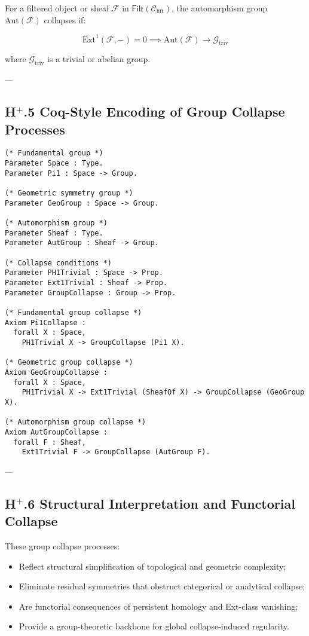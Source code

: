 \documentclass[11pt]{article}
\begin{document}
For a filtered object or sheaf $\mathcal{F}$ in $\mathsf{Filt}(\mathcal{C}_{\mathrm{lift}})$, the automorphism group $\mathrm{Aut}(\mathcal{F})$ collapses if:

\[
\mathrm{Ext}^1(\mathcal{F}, -) = 0 \implies \mathrm{Aut}(\mathcal{F}) \longrightarrow \mathcal{G}_{\mathrm{triv}}
\]

where $\mathcal{G}_{\mathrm{triv}}$ is a trivial or abelian group.

---

\subsection*{H$^{+}$.5 Coq-Style Encoding of Group Collapse Processes}

\begin{lstlisting}[language=Coq]
(* Fundamental group *)
Parameter Space : Type.
Parameter Pi1 : Space -> Group.

(* Geometric symmetry group *)
Parameter GeoGroup : Space -> Group.

(* Automorphism group *)
Parameter Sheaf : Type.
Parameter AutGroup : Sheaf -> Group.

(* Collapse conditions *)
Parameter PH1Trivial : Space -> Prop.
Parameter Ext1Trivial : Sheaf -> Prop.
Parameter GroupCollapse : Group -> Prop.

(* Fundamental group collapse *)
Axiom Pi1Collapse :
  forall X : Space,
    PH1Trivial X -> GroupCollapse (Pi1 X).

(* Geometric group collapse *)
Axiom GeoGroupCollapse :
  forall X : Space,
    PH1Trivial X -> Ext1Trivial (SheafOf X) -> GroupCollapse (GeoGroup X).

(* Automorphism group collapse *)
Axiom AutGroupCollapse :
  forall F : Sheaf,
    Ext1Trivial F -> GroupCollapse (AutGroup F).
\end{lstlisting}

---

\subsection*{H$^{+}$.6 Structural Interpretation and Functorial Collapse}

These group collapse processes:

\begin{itemize}
    \item Reflect structural simplification of topological and geometric complexity;
    \item Eliminate residual symmetries that obstruct categorical or analytical collapse;
    \item Are functorial consequences of persistent homology and Ext-class vanishing;
    \item Provide a group-theoretic backbone for global collapse-induced regularity.
\end{itemize}
\end{document}
